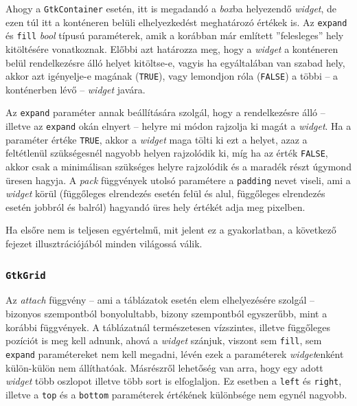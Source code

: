 Ahogy a \texttt{GtkContainer} esetén, itt is megadandó a \textit{box}ba helyezendő \textit{widget}, de ezen túl itt a konténeren belüli elhelyezkedést meghatározó értékek is. Az \texttt{expand} és \texttt{fill} \textit{bool} típusú paraméterek, amik a korábban már említett ''felesleges'' hely kitöltésére vonatkoznak. Előbbi azt határozza meg, hogy a \textit{widget} a konténeren belül rendelkezésre álló helyet kitöltse-e, vagyis ha egyáltalában van szabad hely, akkor azt igényelje-e magának (\texttt{TRUE}), vagy lemondjon róla (\texttt{FALSE}) a többi -- a konténerben lévő -- \textit{widget} javára.

Az \texttt{expand} paraméter annak beállítására szolgál, hogy a rendelkezésre álló -- illetve az \texttt{expand} okán elnyert -- helyre mi módon rajzolja ki magát a \textit{widget}. Ha a paraméter értéke \texttt{TRUE}, akkor a \textit{widget} maga tölti ki ezt a helyet, azaz a feltétlenül szükségesnél nagyobb helyen rajzolódik ki, míg ha az érték \texttt{FALSE}, akkor csak a minimálisan szükséges helyre rajzolódik és a maradék részt úgymond üresen hagyja. A \textit{pack} függvények utolsó paramétere a \texttt{padding} nevet viseli, ami a \textit{widget} körül (függőleges elrendezés esetén felül és alul, függőleges elrendezés esetén jobbról és balról) hagyandó üres hely értékét adja meg pixelben.

Ha elsőre nem is teljesen egyértelmű, mit jelent ez a gyakorlatban, a következő fejezet illusztrációjából minden világossá válik.

\subsubsection{\texttt{GtkGrid}}

Az \textit{attach} függvény -- ami a táblázatok esetén elem elhelyezésére szolgál -- bizonyos szempontból bonyolultabb, bizony szempontból egyszerűbb, mint a korábbi függvények. A táblázatnál természetesen vízszintes, illetve függőleges pozíciót is meg kell adnunk, ahová a \textit{widget} szánjuk, viszont sem \texttt{fill}, sem \texttt{expand} paramétereket nem kell megadni, lévén ezek a paraméterek \textit{widget}enként külön-külön nem állíthatóak. Másrészről lehetőség van arra, hogy egy adott \textit{widget} több oszlopot illetve több sort is elfoglaljon. Ez esetben a \texttt{left} és \texttt{right}, illetve a \texttt{top} és a \texttt{bottom} paraméterek értékének különbsége nem egynél nagyobb.

